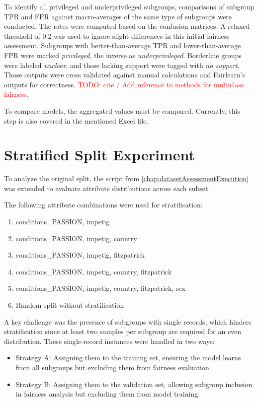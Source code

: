 \documentclass[12pt, a4paper, oneside]{book}   	%
\renewcommand{\todo}[1]{\textcolor{red}{TODO: #1}}
\begin{document}
		To identify all privileged and underprivileged subgroups, comparisons of subgroup \gls{TPR} and \gls{FPR} against macro-averages of the same type of subgroups were conducted. The rates were computed based on the confusion matrices. A relaxed threshold of 0.2 was used to ignore slight differences in this initial fairness assessment. Subgroups with better-than-average \gls{TPR} and lower-than-average \gls{FPR} were marked \textit{privileged}, the inverse as \textit{underprivileged}. Borderline groups were labeled \textit{unclear}, and those lacking support were tagged with \textit{no support}. Those outputs were cross validated against manual calculations and \gls{Fairlearn}'s outputs for correctness. \todo{cite / Add reference to methods for multiclass fairness.}
		
		To compare models, the aggregated values must be compared. Currently, this step is also covered in the mentioned Excel file.
		
		
		\section{Stratified Split Experiment}
		To analyze the original split, the script from \autoref{chap:datasetAssessmentExecution} was extended to evaluate attribute distributions across each subset.
		
		The following attribute combinations were used for stratification:
		\begin{enumerate}
			\item conditions\_PASSION, impetig
			\item conditions\_PASSION, impetig, country
			\item conditions\_PASSION, impetig, fitzpatrick
			\item conditions\_PASSION, impetig, country, fitzpatrick
			\item conditions\_PASSION, impetig, country, fitzpatrick, sex
			\item Random split without stratification
		\end{enumerate}
		
		A key challenge was the presence of subgroups with single records, which hinders stratification since at least two samples per subgroup are required for an even distribution. These single-record instances were handled in two ways:
		\begin{itemize}
			\item Strategy A: Assigning them to the training set, ensuring the model learns from all subgroups but excluding them from fairness evaluation.
			\item Strategy B: Assigning them to the validation set, allowing subgroup inclusion in fairness analysis but excluding them from model training.
		\end{itemize}
		
\end{document}
